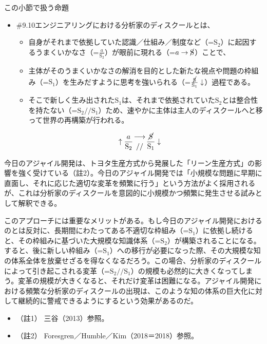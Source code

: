 \begin{note}{}{この小節で扱う命題}
  \begin{itemize}
    \tightlist
    \item{\#9.10}エンジニアリングにおける分析家のディスクールとは、
      \begin{itemize}
        \tightlist
        \item 自身がそれまで依拠していた認識／仕組み／制度など（=$\textrm{S}_2$）に起因するうまくいかなさ（=$\frac{a}{\textrm{S}_2}$）が眼前に現れる（=$a\rightarrow\cancel{\textrm{S}}$）ことで、
        \item 主体がそのうまくいかなさの解消を目的とした新たな視点や問題の枠組み（=$\textrm{S}_1$）を生みだすように思考を強いられる（=$\frac{\cancel{\textrm{S}}}{\textrm{S}_1}\downarrow$）過程である。
        \item そこで新しく生み出された$\textrm{S}_1$は、それまで依拠されていた$\textrm{S}_2$とは整合性を持たない（=$\textrm{S}_2//\textrm{S}_1$）ため、速やかに主体は主人のディスクールへと移って世界の再構築が行われる。
      \end{itemize}

$$
\uparrow\frac{a}{\mathrm{S_2}}\genfrac{}{}{0pt}{}{\longrightarrow}{//}\frac{\mathrm{\cancel{S}}}{\mathrm{S_1}}\downarrow
$$
  \end{itemize}
\end{note}

今日のアジャイル開発は、トヨタ生産方式から発展した「リーン生産方式」の影響を強く受けている（註2）。今日のアジャイル開発では「小規模な問題に早期に直面し、それに応じた適切な変革を頻繁に行う」という方法がよく採用されるが、これは分析家のディスクールを意図的に小規模かつ頻繁に発生させる試みとして解釈できる。

このアプローチには重要なメリットがある。もし今日のアジャイル開発におけるのとは反対に、長期間にわたってある不適切な枠組み（=\(\textrm{S}_1\)）に依拠し続けると、その枠組みに基づいた大規模な知識体系（=\(\textrm{S}_2\)）が構築されることになる。すると、後に新しい枠組み（=\(\textrm{S}_1\)）への移行が必要になった際、その大規模な知の体系全体を放棄せざるを得なくなるだろう。この場合、分析家のディスクールによって引き起こされる変革（=\(\textrm{S}_2//\textrm{S}_1\)）の規模も必然的に大きくなってしまう。変革の規模が大きくなると、それだけ変革は困難になる。アジャイル開発における頻繁な分析家のディスクールの出現は、このような知の体系の巨大化に対して継続的に警戒できるようにするという効果があるのだ。

\begin{itemize}
\tightlist
\item
  （註1） 三谷（2013）\cite{Mitani}参照。
\item
  （註2） Foresgren／Humble／Kim（2018＝2018）\cite{ForesgrenEtAl}参照。
\end{itemize}

